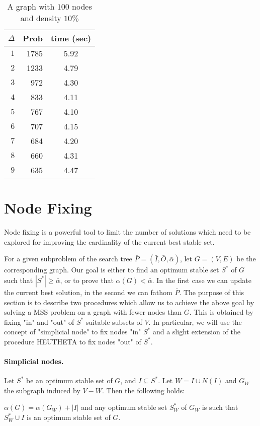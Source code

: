 \begin{table}[bth] 
\caption{A graph with $100$ nodes and density $10\%$}
\label{ta-branch}
\begin{center}
\begin{tabular}{||r|r|c|} \hline
   $\Delta$      &Prob       &time (sec)\\ 
\hline    
   $1$           &1785         &5.92  \\ 
   $2$           &1233         &4.79  \\ 
   $3$           &972          &4.30  \\ 
   $4$           &833          &4.11  \\ 
   $5$           &767          &4.10  \\ 
   $6$           &707          &4.15  \\ 
   $7$           &684          &4.20  \\ 
   $8$           &660          &4.31  \\ 
   $9$           &635          &4.47  \\ 
 \hline 
\end{tabular}
\end{center}
\end{table}

\def\balf{{\bar \alpha}}
\section{Node Fixing}
\label{Se-Fix}


Node fixing is a powerful tool to limit the number of solutions which
need to be  explored for improving the cardinality of the current
best stable set.

For a given subproblem of the search tree $\bar P
= (\bar I,\bar O,\balf)$, let 
$G=(V,E)$ be the corresponding graph. Our goal is either to find an
optimum stable set $S^*$ of $G$ such that $|S^*| \geq \balf$, or to
prove that $\alpha(G)<\balf$. In the first case we can update the
current best solution, in the second we can fathom $\bar P$.
 The purpose of this section is to describe two procedures which
allow us to achieve the above goal by solving a MSS problem on a
graph with fewer nodes than $G$. This is obtained by fixing "in"
and "out" of $S^*$ suitable subsets of $V$. In particular, we will
use the concept of "simplicial node" to fix nodes "in" $S^*$ and a
slight extension of the procedure HEUTHETA to fix nodes "out" of
$S^*$.

\paragraph{Simplicial nodes.} Let $S^*$ be an optimum
stable set of $G$, and $I \subseteq S^*$. Let $W=I\cup N(I)$ and
$G_W$ the subgraph induced by $V-W$. Then the following holds:
\begin{fact}
\label{fa-fixin}
$\alpha(G) = \alpha(G_W) + |I|$ and any optimum stable set $S^*_W$ of
$G_W$ is such that  $S^*_W \cup I$ is an optimum stable set of $G$.
\end{fact}

